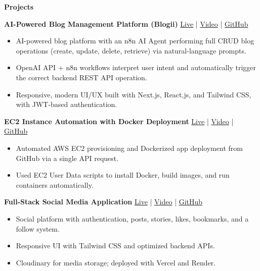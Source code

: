 \documentclass[10pt]{article}
\newcommand{\sectiontitle}[1]{%
  \par\vspace{8pt}%
  \noindent\textbf{\large #1}\par
  \vspace{-2pt}\noindent\hrulefill\par
  \vspace{4pt}%
}
\begin{document}
\sectiontitle{Projects}

\noindent\textbf{AI-Powered Blog Management Platform (Blogii)} \hfill
\href{https://uzerqureshi-blog.netlify.app}{Live} | \href{https://youtu.be/uINd_sg_WIo}{Video} | \href{https://github.com/08Uzair/Uzer-2025}{GitHub}\par
\vspace{2pt}
\begin{itemize}
  \item AI-powered blog platform with an n8n AI Agent performing full CRUD blog operations (create, update, delete, retrieve) via natural-language prompts.
  \item OpenAI API + n8n workflows interpret user intent and automatically trigger the correct backend REST API operation.
  \item Responsive, modern UI/UX built with Next.js, React.js, and Tailwind CSS, with JWT-based authentication.
\end{itemize}

\noindent\textbf{EC2 Instance Automation with Docker Deployment} \hfill
\href{https://uzer-ec2-automation.netlify.app}{Live} | \href{https://youtu.be/jxxod8CJKP8}{Video} | \href{https://github.com/08Uzair/aws-ec2-automation}{GitHub}\par
\vspace{2pt}
\begin{itemize}
  \item Automated AWS EC2 provisioning and Dockerized app deployment from GitHub via a single API request.
  \item Used EC2 User Data scripts to install Docker, build images, and run containers automatically.
\end{itemize}

\noindent\textbf{Full-Stack Social Media Application} \hfill
\href{https://social-media-application-umber.vercel.app}{Live} | \href{https://youtu.be/MWrUsxIS_6w}{Video} | \href{https://github.com/08Uzair/Social-Media-Application}{GitHub}\par
\vspace{2pt}
\begin{itemize}
  \item Social platform with authentication, posts, stories, likes, bookmarks, and a follow system.
  \item Responsive UI with Tailwind CSS and optimized backend APIs.
  \item Cloudinary for media storage; deployed with Vercel and Render.
\end{itemize}
\end{document}
